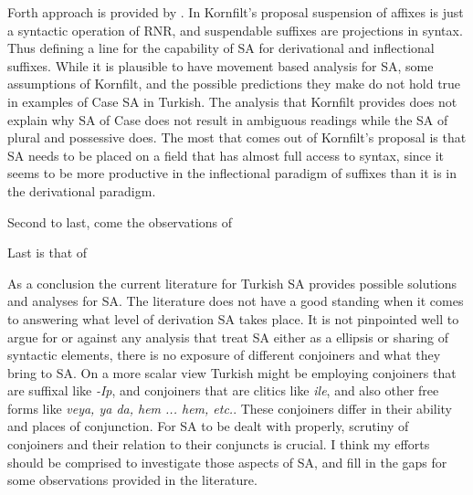 Forth approach is provided by \cite{kornfilt1996some, kornfilt2012revisiting}. In Kornfilt's proposal suspension of affixes is just a syntactic operation of RNR, and suspendable suffixes are projections in syntax. Thus defining a line for the capability of SA for derivational and inflectional suffixes. While it is plausible to have movement based analysis for SA, some assumptions of Kornfilt, and the possible predictions they make do not hold true in examples of Case SA in Turkish. The analysis that Kornfilt provides does not explain why SA of Case does not result in ambiguous readings while the SA of plural and possessive does. The most that comes out of Kornfilt's proposal is that SA needs to be placed on a field that has almost full access to syntax, since it seems to be more productive in the inflectional paradigm of suffixes than it is in the derivational paradigm.

Second to last, come the observations of \cite{kharytonava2012word,kharytonava2012taming}

Last is that of \cite{akkucs2016suspended}

As a conclusion the current literature for Turkish SA provides possible solutions and analyses for SA. The literature does not have a good standing when it comes to answering what level of derivation SA takes place.  It is not pinpointed well to argue for or against any analysis that treat SA either as a ellipsis or sharing of syntactic elements, there is no exposure of different conjoiners and what they bring to SA. On a more scalar view Turkish might be employing conjoiners that are suffixal like \textit{-Ip}, and conjoiners that are clitics like \textit{ile}, and also other free forms like \textit{veya, ya da, hem ... hem, etc.}. These conjoiners differ in their ability and places of conjunction. For SA to be dealt with properly, scrutiny of conjoiners and their relation to their conjuncts is crucial. I think my efforts should be comprised to investigate those aspects of SA, and fill in the gaps for some observations provided in the literature.  
